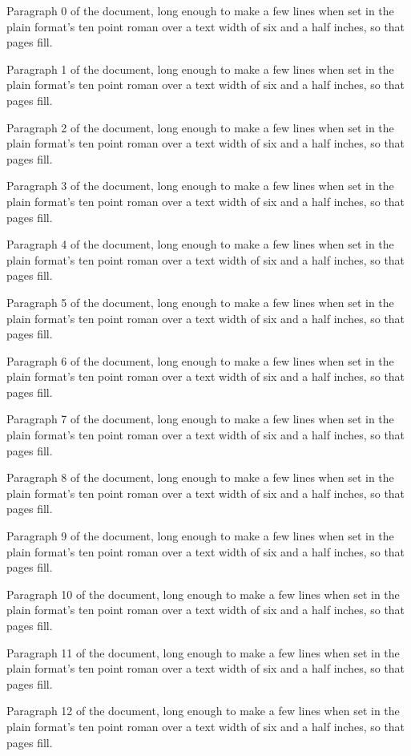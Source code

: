 Paragraph 0 of the document, long enough to make a few lines when set in the plain format's ten point roman over a text width of six and a half inches, so that pages fill.

Paragraph 1 of the document, long enough to make a few lines when set in the plain format's ten point roman over a text width of six and a half inches, so that pages fill.

Paragraph 2 of the document, long enough to make a few lines when set in the plain format's ten point roman over a text width of six and a half inches, so that pages fill.

Paragraph 3 of the document, long enough to make a few lines when set in the plain format's ten point roman over a text width of six and a half inches, so that pages fill.

Paragraph 4 of the document, long enough to make a few lines when set in the plain format's ten point roman over a text width of six and a half inches, so that pages fill.

Paragraph 5 of the document, long enough to make a few lines when set in the plain format's ten point roman over a text width of six and a half inches, so that pages fill.

Paragraph 6 of the document, long enough to make a few lines when set in the plain format's ten point roman over a text width of six and a half inches, so that pages fill.

Paragraph 7 of the document, long enough to make a few lines when set in the plain format's ten point roman over a text width of six and a half inches, so that pages fill.

Paragraph 8 of the document, long enough to make a few lines when set in the plain format's ten point roman over a text width of six and a half inches, so that pages fill.

Paragraph 9 of the document, long enough to make a few lines when set in the plain format's ten point roman over a text width of six and a half inches, so that pages fill.

Paragraph 10 of the document, long enough to make a few lines when set in the plain format's ten point roman over a text width of six and a half inches, so that pages fill.

Paragraph 11 of the document, long enough to make a few lines when set in the plain format's ten point roman over a text width of six and a half inches, so that pages fill.

Paragraph 12 of the document, long enough to make a few lines when set in the plain format's ten point roman over a text width of six and a half inches, so that pages fill.

